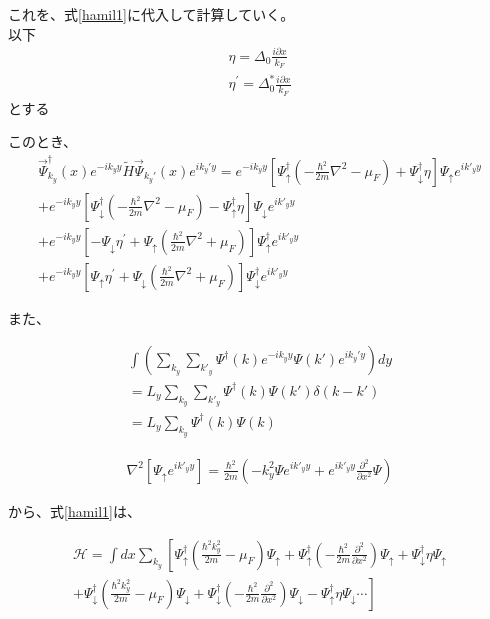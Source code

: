 \documentclass{jsarticle}
\begin{document}
		これを、式\eqref{hamil1}に代入して計算していく。　\\

		以下
		\begin{align}
			\eta=\Delta_0\frac{i\partial x}{k_F} \\
			\eta^{'}=\Delta_0^\ast\frac{i\partial x}{k_F}
		\end{align}
		とする


		このとき、
		\begin{align}
			\vec{\Psi}_{k_y}^\dagger(x) e^{-ik_yy} \tilde{H}  \vec{\Psi}_{k_y'}(x) e^{ik_y'y} =
			e^{-ik_yy} \left[ \Psi_\uparrow^\dagger \left( -\frac{\hbar^2}{2m}\nabla^2-\mu_F \right) +\Psi_\downarrow^\dagger \eta \right] \Psi_\uparrow e^{ik'_yy} \nonumber\\
			+e^{-ik_yy} \left[ \Psi_\downarrow^\dagger \left( -\frac{\hbar^2}{2m}\nabla^2-\mu_F \right) -\Psi_\uparrow^\dagger \eta \right] \Psi_\downarrow e^{ik'_yy} \nonumber\\
			+ e^{-ik_yy} \left[ -\Psi_\downarrow \eta^{'} +\Psi_\uparrow \left( \frac{\hbar^2}{2m}\nabla^2+\mu_F \right) \right] \Psi_\uparrow^\dagger e^{ik'_yy} \nonumber\\
			+e^{-ik_yy} \left[ \Psi_\uparrow \eta^{'} +\Psi_\downarrow \left( \frac{\hbar^2}{2m}\nabla^2+\mu_F \right) \right] \Psi_\downarrow^\dagger e^{ik'_yy}
		\end{align}

		また、

		\begin{align}
		\int \left( \sum_{k_y}\sum_{k'_y}\Psi^\dagger(k) e^{-ik_yy}\Psi(k')e^{ik_y'y} \right) dy \nonumber \\
		=L_y\sum_{k_y}\sum_{k'_y}\Psi^\dagger(k) \Psi(k')\delta \left( k-k' \right) \nonumber \\
		=L_y\sum_{k_y}\Psi^\dagger(k)\Psi(k)
		\end{align}

		\begin{align}
			\nabla^2 \left[ \Psi_\uparrow e^{ik'_yy} \right]=
			\frac{\hbar^2}{2m}
			\left( -k_y^2\Psi e^{ik'_yy} + e^{ik'_yy}\frac{\partial^2}{\partial x^2}\Psi \right)
		\end{align}


		から、式\eqref{hamil1}は、

		\begin{align}
			\mathcal{H}=\int dx \sum_{k_y}
			\left[ \Psi_\uparrow^\dagger \left( \frac{\hbar^2k_y^2}{2m}-\mu_F \right)\Psi_\uparrow
			+\Psi_\uparrow^\dagger \left(- \frac{\hbar^2}{2m}\frac{\partial^2}{\partial x^2}\right)\Psi_\uparrow
			+\Psi_\downarrow^\dagger \eta \Psi_\uparrow \right. \nonumber \\ \left.+
			\Psi_\downarrow^\dagger \left( \frac{\hbar^2k_y^2}{2m}-\mu_F \right)\Psi_\downarrow
			+\Psi_\downarrow^\dagger \left(- \frac{\hbar^2}{2m}\frac{\partial^2}{\partial x^2} \right) \Psi_\downarrow
			-\Psi_\uparrow^\dagger \eta \Psi_\downarrow \cdots
			\right]
			\label{hamil2}
		\end{align}
\end{document}
